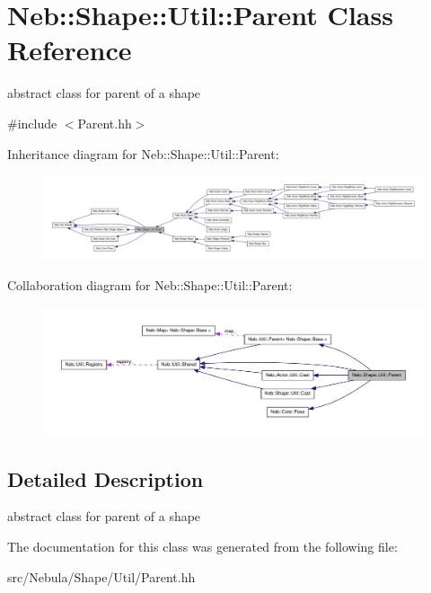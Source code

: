 \hypertarget{classNeb_1_1Shape_1_1Util_1_1Parent}{\section{\-Neb\-:\-:\-Shape\-:\-:\-Util\-:\-:\-Parent \-Class \-Reference}
\label{classNeb_1_1Shape_1_1Util_1_1Parent}
}


abstract class for parent of a shape  




{\ttfamily \#include $<$\-Parent.\-hh$>$}



\-Inheritance diagram for \-Neb\-:\-:\-Shape\-:\-:\-Util\-:\-:\-Parent\-:\nopagebreak
\begin{figure}[H]
\begin{center}
\leavevmode
\includegraphics[width=350pt]{classNeb_1_1Shape_1_1Util_1_1Parent__inherit__graph}
\end{center}
\end{figure}


\-Collaboration diagram for \-Neb\-:\-:\-Shape\-:\-:\-Util\-:\-:\-Parent\-:\nopagebreak
\begin{figure}[H]
\begin{center}
\leavevmode
\includegraphics[width=350pt]{classNeb_1_1Shape_1_1Util_1_1Parent__coll__graph}
\end{center}
\end{figure}


\subsection{\-Detailed \-Description}
abstract class for parent of a shape 

\-The documentation for this class was generated from the following file\-:\begin{DoxyCompactItemize}
\item 
src/\-Nebula/\-Shape/\-Util/\-Parent.\-hh\end{DoxyCompactItemize}

